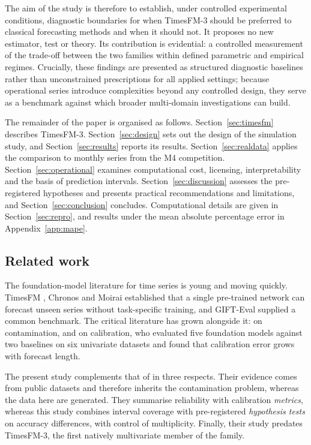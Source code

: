 \documentclass[article]{ajs}
\providecommand{\sectionref}[1]{Section~\ref{#1}}
\providecommand{\appendixref}[1]{Appendix~\ref{#1}}
\begin{document}
The aim of the study is therefore to establish, under controlled experimental conditions, diagnostic
boundaries for when TimesFM-3 should be preferred to classical forecasting methods and when it should
not. It proposes no new estimator, test or theory. Its contribution is evidential: a controlled
measurement of the trade-off between the two families within defined parametric and empirical regimes.
Crucially, these findings are presented as structured diagnostic baselines rather than unconstrained
prescriptions for all applied settings; because operational series introduce complexities beyond any
controlled design, they serve as a benchmark against which broader multi-domain investigations can build.

The remainder of the paper is organised as follows. \sectionref{sec:timesfm} describes
TimesFM-3. \sectionref{sec:design} sets out the design of the simulation study, and
\sectionref{sec:results} reports its results. \sectionref{sec:realdata} applies the comparison to
monthly series from the M4 competition. \sectionref{sec:operational} examines computational cost,
licensing, interpretability and the basis of prediction intervals. \sectionref{sec:discussion}
assesses the pre-registered hypotheses and presents practical recommendations and limitations,
and \sectionref{sec:conclusion} concludes. Computational details are given in
\sectionref{sec:repro}, and results under the mean absolute percentage error in
\appendixref{app:mape}.

\subsection{Related work}
\label{sec:related}

The foundation-model literature for time series is young and moving quickly. TimesFM
\citep{das2024timesfm}, Chronos \citep{ansari2024chronos} and Moirai \citep{woo2024moirai}
established that a single pre-trained network can forecast unseen series without task-specific
training, and GIFT-Eval \citep{aksu2024gifteval} supplied a common benchmark. The critical
literature has grown alongside it: \citet{meyer2025leakage} on contamination, and
\citet{adler2026calibrated} on calibration, who evaluated five foundation models against two
baselines on six univariate datasets and found that calibration error grows with forecast
length.

The present study complements that of \citet{adler2026calibrated} in three respects. Their
evidence comes from public datasets and therefore inherits the contamination problem, whereas the
data here are generated. They summarise reliability with calibration \emph{metrics}, whereas this
study combines interval coverage with pre-registered \emph{hypothesis tests} on accuracy
differences, with control of multiplicity. Finally, their study predates TimesFM-3, the first
natively multivariate member of the family.
\end{document}
